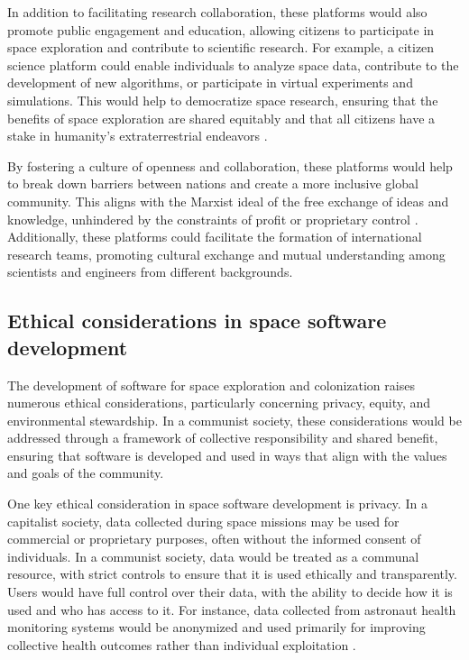 In addition to facilitating research collaboration, these platforms would also promote public engagement and education, allowing citizens to participate in space exploration and contribute to scientific research. For example, a citizen science platform could enable individuals to analyze space data, contribute to the development of new algorithms, or participate in virtual experiments and simulations. This would help to democratize space research, ensuring that the benefits of space exploration are shared equitably and that all citizens have a stake in humanity's extraterrestrial endeavors \cite[pp.~180-183]{gramsci1971}.

By fostering a culture of openness and collaboration, these platforms would help to break down barriers between nations and create a more inclusive global community. This aligns with the Marxist ideal of the free exchange of ideas and knowledge, unhindered by the constraints of profit or proprietary control \cite[pp.~230-233]{bookchin1991}. Additionally, these platforms could facilitate the formation of international research teams, promoting cultural exchange and mutual understanding among scientists and engineers from different backgrounds.

\subsection{Ethical considerations in space software development}

The development of software for space exploration and colonization raises numerous ethical considerations, particularly concerning privacy, equity, and environmental stewardship. In a communist society, these considerations would be addressed through a framework of collective responsibility and shared benefit, ensuring that software is developed and used in ways that align with the values and goals of the community.

One key ethical consideration in space software development is privacy. In a capitalist society, data collected during space missions may be used for commercial or proprietary purposes, often without the informed consent of individuals. In a communist society, data would be treated as a communal resource, with strict controls to ensure that it is used ethically and transparently. Users would have full control over their data, with the ability to decide how it is used and who has access to it. For instance, data collected from astronaut health monitoring systems would be anonymized and used primarily for improving collective health outcomes rather than individual exploitation \cite[pp.~120-122]{marx1973}.

